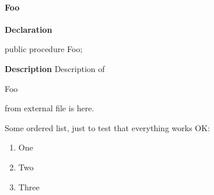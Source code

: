 \documentclass{report}
\newif\ifpdf
\begin{document}
\paragraph*{Foo}\hspace*{\fill}

\label{ok_description_test.TMyClass-Foo}
\begin{list}{}{
\setlength{\itemindent}{0cm}
\setlength{\listparindent}{0cm}
\setlength{\leftmargin}{\evensidemargin}
\addtolength{\leftmargin}{\tmplength}
\settowidth{\labelsep}{X}
\addtolength{\leftmargin}{\labelsep}
\setlength{\labelwidth}{\tmplength}
}
\item[\textbf{Declaration}\hfill]
\ifpdf
\begin{flushleft}
\fi
\begin{ttfamily}
public procedure Foo;\end{ttfamily}

\ifpdf
\end{flushleft}
\fi

\par
\item[\textbf{Description}]
Description of \begin{ttfamily}Foo\end{ttfamily} from external file is here.

Some ordered list, just to test that everything works OK: \begin{enumerate}
\setcounter{enumi}{0} \setcounter{enumii}{0} \setcounter{enumiii}{0} \setcounter{enumiv}{0} 
\item One
\setcounter{enumi}{1} \setcounter{enumii}{1} \setcounter{enumiii}{1} \setcounter{enumiv}{1} 
\item Two
\setcounter{enumi}{2} \setcounter{enumii}{2} \setcounter{enumiii}{2} \setcounter{enumiv}{2} 
\item Three
\end{enumerate}

\end{list}
\end{document}
